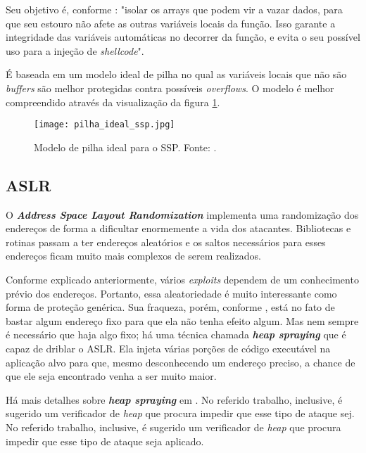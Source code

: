 			Seu objetivo é, conforme \cite{Martins2009}:
			"isolar os arrays que podem vir a vazar dados, para que seu estouro não
			afete as outras variáveis locais da função. Isso garante a integridade das variáveis
            automáticas no decorrer da função, e evita o seu possível uso para a injeção de \textsl{shellcode}".

			
			É baseada em um modelo ideal de pilha no qual as variáveis locais que não
			são \textsl{buffers} são melhor protegidas contra possíveis \textsl{overflows}.
			O modelo é melhor compreendido através da visualização da figura \ref{fig:pilha_ideal_ssp}.

			\begin{figure}
				\begin{center}
					\texttt{[image: pilha\_ideal\_ssp.jpg]}
					\caption{Modelo de pilha ideal para o SSP. Fonte: \cite{Martins2009}.}
					\label{fig:pilha_ideal_ssp}
				\end{center}
			\end{figure}


		\subsection{ASLR}
			O \textsl{\textbf{Address Space Layout Randomization}} implementa uma randomização
			dos endereços de forma a dificultar enormemente a vida dos atacantes.
			Bibliotecas e rotinas passam a ter endereços aleatórios e os saltos necessários
			para esses endereços ficam muito mais complexos de serem realizados.

			
			Conforme explicado anteriormente, vários \textsl{exploits} dependem de um conhecimento
			prévio dos endereços. Portanto, essa aleatoriedade é muito interessante como
			forma de proteção genérica. Sua fraqueza, porém, conforme \cite{Anley2007}, está no fato
			de bastar algum endereço fixo para que ela não tenha efeito algum. Mas nem sempre é necessário
			que haja algo fixo; há uma técnica chamada \textsl{\textbf{heap spraying}} que é capaz
			de driblar o ASLR. Ela injeta várias porções de código executável na aplicação alvo
			para que, mesmo desconhecendo um endereço preciso, a chance de que ele seja encontrado
			venha a ser muito maior.

			
			Há mais detalhes sobre \textsl{\textbf{heap spraying}} em \cite{Nozzle}. No referido trabalho,
			inclusive, é sugerido um verificador de \textsl{heap} que procura impedir que esse tipo
			de ataque sej. No referido trabalho,
			inclusive, é sugerido um verificador de \textsl{heap} que procura impedir que esse tipo
			de ataque seja aplicado.
			
			
			

		

		
			
	
